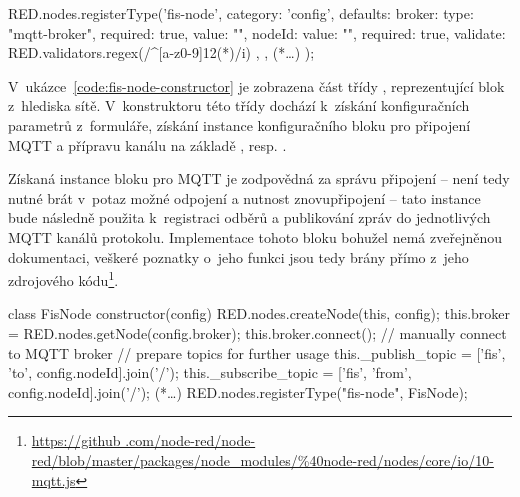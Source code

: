 \begin{code}[
    language=Javascript,
    label=code:fis-node-editor,
    caption={Registrace vlastního bloku do editoru sítě v~nástroji Node-RED.}
]
RED.nodes.registerType('fis-node', {
    category: 'config',
    defaults: {
        broker: {type: "mqtt-broker", required: true, value: ""},
        nodeId: {
            value: "", required: true,
            validate: RED.validators.regex(/^[a-z0-9]{12}(*\textdollar*)/i)
        },
    },
    (*\ldots*)
});
\end{code}

V~ukázce~\ref{code:fis-node-constructor} je zobrazena část třídy , reprezentující blok z~hlediska sítě.
V~konstruktoru této třídy dochází k~získání konfiguračních
parametrů z~formuláře, získání instance konfiguračního bloku pro připojení MQTT a přípravu kanálu na základě
, resp. .

Získaná instance bloku pro MQTT je zodpovědná za správu připojení -- není tedy nutné brát v~potaz možné odpojení a
nutnost znovupřipojení -- tato instance bude následně použita k~registraci odběrů a publikování zpráv do jednotlivých
MQTT kanálů protokolu.
Implementace tohoto bloku bohužel nemá zveřejněnou dokumentaci, veškeré poznatky o~jeho funkci jsou tedy brány přímo
z~jeho zdrojového kódu\footnote{\url{https://github
.com/node-red/node-red/blob/master/packages/node_modules/\%40node-red/nodes/core/io/10-mqtt.js}}.

\begin{code}[
    language=Javascript,
    numbers=left,
    label=code:fis-node-constructor,
    caption={Část konstruktoru třídy \ic{FisNode} obluhující připojení brokeru MQTT a přípravu kanálů pro komunikaci.}
]
class FisNode {
    constructor(config) {
        RED.nodes.createNode(this, config);
        this.broker = RED.nodes.getNode(config.broker);
        this.broker.connect(); // manually connect to MQTT broker
        // prepare topics for further usage
        this._publish_topic = ['fis', 'to', config.nodeId].join('/');
        this._subscribe_topic = ['fis', 'from', config.nodeId].join('/');
    }
    (*\ldots*)
    RED.nodes.registerType("fis-node", FisNode);
}
\end{code}

